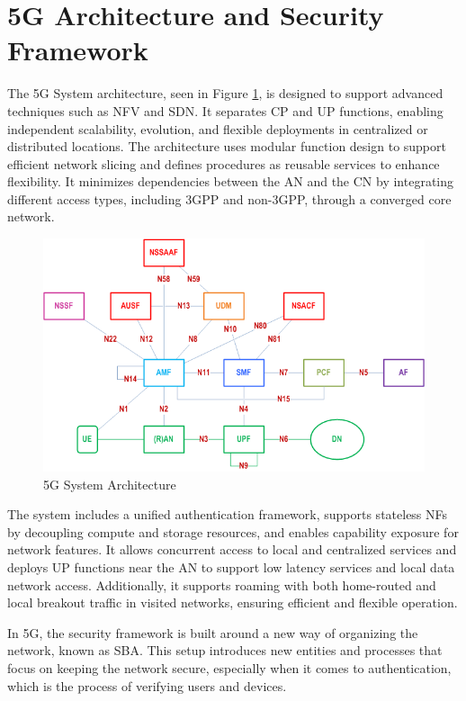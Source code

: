 \section{\acs{5G} Architecture and Security Framework}

The \ac{5G} System architecture, seen in Figure \ref{fig:5G-system-architecture}, is designed to support advanced techniques such as \ac{NFV} and \ac{SDN}. It separates \ac{CP} and \ac{UP} functions, enabling independent scalability, evolution, and flexible deployments in centralized or distributed locations. The architecture uses modular function design to support efficient network slicing and defines procedures as reusable services to enhance flexibility. It minimizes dependencies between the \ac{AN} and the \ac{CN} by integrating different access types, including \ac{3GPP} and non-\ac{3GPP}, through a converged core network.

\begin{figure}
    \centering
    \includegraphics[width=0.75\linewidth]{figs/5g-system-architecture.png}
    \caption{5G System Architecture}
    \label{fig:5G-system-architecture}
\end{figure}

The system includes a unified authentication framework, supports stateless \acp{NF} by decoupling compute and storage resources, and enables capability exposure for network features. It allows concurrent access to local and centralized services and deploys \ac{UP} functions near the \acl{AN} to support low latency services and local data network access. Additionally, it supports roaming with both home-routed and local breakout traffic in visited networks, ensuring efficient and flexible operation.%

In \ac{5G}, the security framework is built around a new way of organizing the network, known as \ac{SBA}. This setup introduces new entities and processes that focus on keeping the network secure, especially when it comes to authentication, which is the process of verifying users and devices.

